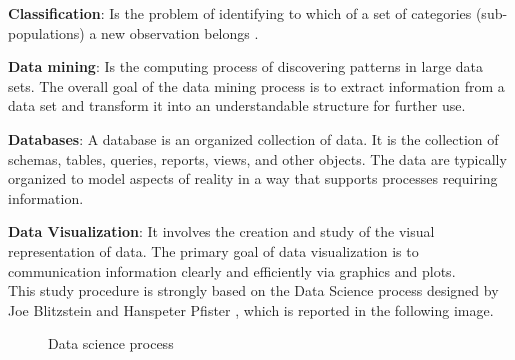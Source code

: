 \textbf{Classification}: Is the problem of identifying to which of a set of categories (sub-populations) a new observation belongs \cite{wiki:Classification}. 


\textbf{Data mining}: Is the computing process of discovering patterns in large data sets. The overall goal of the data mining process is to extract information from a data set and transform it into an understandable structure for further use. 

\textbf{Databases}: A database is an organized collection of data. It is the collection of schemas, tables, queries, reports, views, and other objects. The data are typically organized to model aspects of reality in a way that supports processes requiring information. \cite{wiki:Databases}

\textbf{Data Visualization}: It involves the creation and study of the visual representation of data. The primary goal of data visualization is to communication information clearly and efficiently via graphics and plots. \\



This study procedure is strongly based on the Data Science process designed by Joe Blitzstein and Hanspeter Pfister \cite{DataProcessFramework}, which is reported in the following image.
\begin{figure}[H]
    \centering
    \caption[Data science process]{Data science process}
    \label{fig: Data_science_process}
\end{figure}

